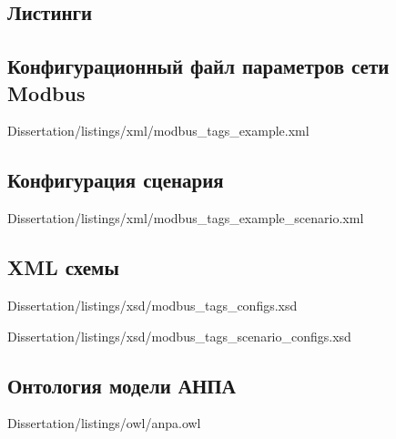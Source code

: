 \begin{landscape}
\chapter{Листинги}
\section{Конфигурационный файл параметров сети Modbus}\label{app:sec:modbus_tag}
    
            {Dissertation/listings/xml/modbus_tags_example.xml}
\end{landscape}

\section{Конфигурация сценария}\label{app:sec:modbus_scenario_example_diagram}

        {Dissertation/listings/xml/modbus_tags_example_scenario.xml}

\begin{landscape}
\section{XML схемы}\label{app:sec:xsd}
    
            {Dissertation/listings/xsd/modbus_tags_configs.xsd}
    
    
            {Dissertation/listings/xsd/modbus_tags_scenario_configs.xsd}        
\end{landscape}

\begin{landscape}
    \section{Онтология модели АНПА}\label{app:sec:anpa_owl}
    
            {Dissertation/listings/owl/anpa.owl}
\end{landscape}


